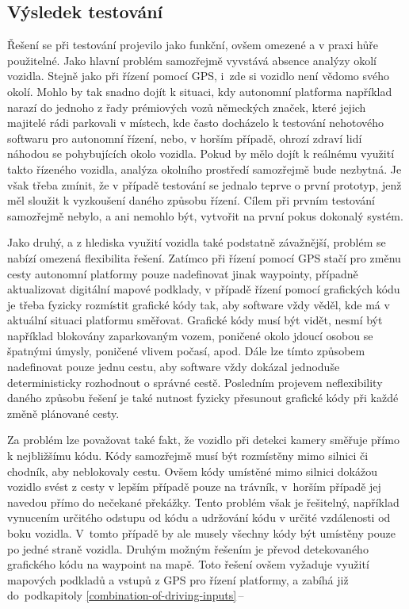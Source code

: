 \documentclass[czech, bachelor]{diploma}
\newcommand{\filipref}[1]{\ref{#1}\,--\,\nameref{#1}}
\begin{document}
\subsection{Výsledek testování}

Řešení se při testování projevilo jako funkční, ovšem omezené a v praxi hůře použitelné. Jako hlavní problém samozřejmě vyvstává
absence analýzy okolí vozidla. Stejně jako při řízení pomocí GPS, i~zde si vozidlo není vědomo svého okolí. Mohlo by tak snadno
dojít k situaci, kdy autonomní platforma například narazí do jednoho z řady prémiových vozů německých značek, které jejich
majitelé rádi parkovali v místech, kde často docházelo k testování nehotového softwaru pro autonomní řízení, nebo, v horším
případě, ohrozí zdraví lidí náhodou se pohybujících okolo vozidla. Pokud by mělo dojít k reálnému využití takto řízeného vozidla,
analýza okolního prostředí samozřejmě bude nezbytná. Je však třeba zmínit, že v případě testování se jednalo teprve o první
prototyp, jenž měl sloužit k vyzkoušení daného způsobu řízení. Cílem při prvním testování samozřejmě nebylo, a ani nemohlo být,
vytvořit na první pokus dokonalý systém.

Jako druhý, a z hlediska využití vozidla také podstatně závažnější, problém se nabízí omezená flexibilita řešení. Zatímco při
řízení pomocí GPS stačí pro změnu cesty autonomní platformy pouze nadefinovat jinak waypointy, případně aktualizovat digitální
mapové podklady, v případě řízení pomocí grafických kódu je třeba fyzicky rozmístit grafické kódy tak, aby software vždy věděl,
kde má v aktuální situaci platformu směřovat. Grafické kódy musí být vidět, nesmí být například blokovány zaparkovaným vozem,
poničené okolo jdoucí osobou se špatnými úmysly, poničené vlivem počasí, apod. Dále lze tímto způsobem nadefinovat pouze jednu
cestu, aby software vždy dokázal jednoduše deterministicky rozhodnout o správné cestě. Posledním projevem neflexibility daného
způsobu řešení je také nutnost fyzicky přesunout grafické kódy při každé změně plánované cesty.

Za problém lze považovat také fakt, že vozidlo při detekci kamery směřuje přímo k nejbližšímu kódu. Kódy samozřejmě musí být
rozmístěny mimo silnici či chodník, aby neblokovaly cestu. Ovšem kódy umístěné mimo silnici dokážou vozidlo svést z cesty
v lepším případě pouze na trávník, v~horším případě jej navedou přímo do nečekané překážky. Tento problém však je řešitelný,
například vynucením určitého odstupu od kódu a udržování kódu v určité vzdálenosti od boku vozidla.  V~tomto případě by ale musely
všechny kódy být umístěny pouze po jedné straně vozidla. Druhým možným řešením je převod detekovaného grafického kódu na waypoint
na mapě. Toto řešení ovšem vyžaduje využití mapových podkladů a vstupů z GPS pro řízení platformy, a zabíhá již do~podkapitoly
\filipref{combination-of-driving-inputs}
\end{document}
